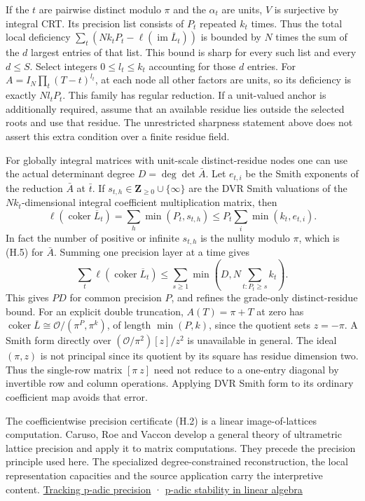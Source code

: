 \documentclass[
  11pt,
]{article}
\begin{document}
If the \(t\) are pairwise distinct modulo \(\pi\) and the \(\alpha_t\)
are units, \(V\) is surjective by integral CRT. Its precision list
consists of \(P_t\) repeated \(k_t\) times. Thus the total local
deficiency \(\sum_t (Nk_tP_t-\ell(\operatorname{im}\overline L_t))\) is
bounded by \(N\) times the sum of the \(d\) largest entries of that
list. This bound is sharp for every such list and every \(d\le S\).
Select integers \(0\le l_t\le k_t\) accounting for those \(d\) entries.
For \(A=I_N\prod_t(T-t)^{l_t}\), at each node all other factors are
units, so its deficiency is exactly \(Nl_tP_t\). This family has regular
reduction. If a unit-valued anchor is additionally required, assume that
an available residue lies outside the selected roots and use that
residue. The unrestricted sharpness statement above does not assert this
extra condition over a finite residue field.

For globally integral matrices with unit-scale distinct-residue nodes
one can use the actual determinant degree \(D=\deg\det\bar A\). Let
\(e_{t,i}\) be the Smith exponents of the reduction \(\bar A\) at
\(\bar t\). If \(s_{t,h}\in\mathbf Z_{\ge0}\cup\{\infty\}\) are the DVR
Smith valuations of the \(Nk_t\)-dimensional integral coefficient
multiplication matrix, then \[
 \ell(\operatorname{coker}\overline L_t)=\sum_h\min(P_t,s_{t,h})
 \le P_t\sum_i\min(k_t,e_{t,i}).
\] In fact the number of positive or infinite \(s_{t,h}\) is the nullity
modulo \(\pi\), which is (H.5) for \(\bar A\). Summing one precision
layer at a time gives \[
 \sum_t\ell(\operatorname{coker}\overline L_t)\le
 \sum_{s\ge1}\min\left(D,N\sum_{t:P_t\ge s}k_t\right). \tag{A.11}
\] This gives \(PD\) for common precision \(P\), and refines the
grade-only distinct-residue bound. For an explicit double truncation,
\(A(T)=\pi+T\) at zero has
\(\operatorname{coker}\overline L\cong\mathcal O/(\pi^P,\pi^k)\), of
length \(\min(P,k)\), since the quotient sets \(z=-\pi\). A Smith form
directly over \((\mathcal O/\pi^2)[z]/z^2\) is unavailable in general.
The ideal \((\pi,z)\) is not principal since its quotient by its square
has residue dimension two. Thus the single-row matrix \([\pi\ z]\) need
not reduce to a one-entry diagonal by invertible row and column
operations. Applying DVR Smith form to its ordinary coefficient map
avoids that error.

The coefficientwise precision certificate (H.2) is a linear
image-of-lattices computation. Caruso, Roe and Vaccon develop a general
theory of ultrametric lattice precision and apply it to matrix
computations. They precede the precision principle used here. The
specialized degree-constrained reconstruction, the local representation
capacities and the source application carry the interpretive content.
\href{https://doi.org/10.1112/S1461157014000357}{Tracking p-adic
precision} ·
\href{https://www.unilim.fr/pages_perso/tristan.vaccon/padicstability.pdf}{p-adic
stability in linear algebra}
\end{document}
